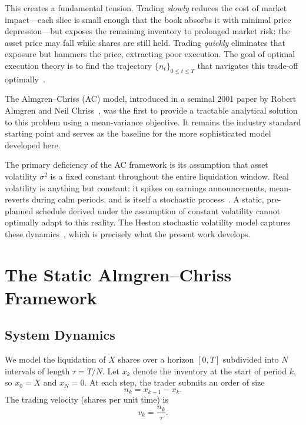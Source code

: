 \documentclass[11pt]{article}
\begin{document}
This creates a fundamental tension. Trading \emph{slowly} reduces the cost of market impact---each
slice is small enough that the book absorbs it with minimal price depression---but exposes the
remaining inventory to prolonged market risk: the asset price may fall while shares are still held.
Trading \emph{quickly} eliminates that exposure but hammers the price, extracting poor execution.
The goal of optimal execution theory is to find the trajectory $\{n_t\}_{0 \le t \le T}$ that
navigates this trade-off optimally~\cite{kyle1985continuous}.

The Almgren--Chriss (AC) model, introduced in a seminal 2001 paper by Robert Almgren and Neil
Chriss~\cite{almgren2001optimal}, was the first to provide a tractable analytical solution to this
problem using a mean-variance objective. It remains the industry standard starting point and
serves as the baseline for the more sophisticated model developed here.

The primary deficiency of the AC framework is its assumption that asset volatility $\sigma^2$ is a
fixed constant throughout the entire liquidation window. Real volatility is anything but constant:
it spikes on earnings announcements, mean-reverts during calm periods, and is itself a stochastic
process~\cite{engle1982arch}.
A static, pre-planned schedule derived under the assumption of constant volatility cannot
optimally adapt to this reality. The Heston stochastic volatility model captures these
dynamics~\cite{heston1993closed}, which is precisely what the present work develops.

\section{The Static Almgren--Chriss Framework}

\subsection{System Dynamics}

We model the liquidation of $X$ shares over a horizon $[0, T]$ subdivided into $N$ intervals of
length $\tau = T/N$. Let $x_k$ denote the inventory at the start of period $k$, so $x_0 = X$
and $x_N = 0$. At each step, the trader submits an order of size
\[
n_k = x_{k-1} - x_k.
\]
The trading velocity (shares per unit time) is
\[
v_k = \frac{n_k}{\tau}.
\]
\end{document}
